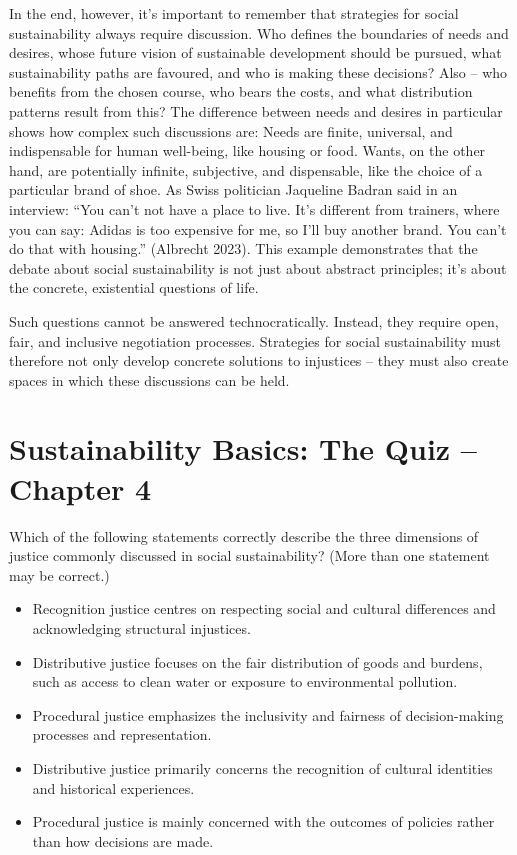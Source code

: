 \documentclass[
  a4paper,
  DIV=11,
  numbers=noendperiod,
  oneside,
  openany]{scrreprt}
\providecommand{\tightlist}{%
  \setlength{\itemsep}{0pt}\setlength{\parskip}{0pt}}
\begin{document}
In the end, however, it's important to remember that strategies for
social sustainability always require discussion. Who defines the
boundaries of needs and desires, whose future vision of sustainable
development should be pursued, what sustainability paths are favoured,
and who is making these decisions? Also -- who benefits from the chosen
course, who bears the costs, and what distribution patterns result from
this? The difference between needs and desires in particular shows how
complex such discussions are: Needs are finite, universal, and
indispensable for human well-being, like housing or food. Wants, on the
other hand, are potentially infinite, subjective, and dispensable, like
the choice of a particular brand of shoe. As Swiss politician Jaqueline
Badran said in an interview: ``You can't not have a place to live. It's
different from trainers, where you can say: Adidas is too expensive for
me, so I'll buy another brand. You can't do that with housing.''
(Albrecht 2023). This example demonstrates that the debate about social
sustainability is not just about abstract principles; it's about the
concrete, existential questions of life.

Such questions cannot be answered technocratically. Instead, they
require open, fair, and inclusive negotiation processes. Strategies for
social sustainability must therefore not only develop concrete solutions
to injustices -- they must also create spaces in which these discussions
can be held.

\section{Sustainability Basics: The Quiz -- Chapter
4}\label{sustainability-basics-the-quiz-chapter-4}

Which of the following statements correctly describe the three
dimensions of justice commonly discussed in social sustainability? (More
than one statement may be correct.)

\begin{itemize}
\tightlist
\item[$\square$]
  Recognition justice centres on respecting social and cultural
  differences and acknowledging structural injustices.
\item[$\square$]
  Distributive justice focuses on the fair distribution of goods and
  burdens, such as access to clean water or exposure to environmental
  pollution.
\item[$\square$]
  Procedural justice emphasizes the inclusivity and fairness of
  decision-making processes and representation.
\item[$\square$]
  Distributive justice primarily concerns the recognition of cultural
  identities and historical experiences.
\item[$\square$]
  Procedural justice is mainly concerned with the outcomes of policies
  rather than how decisions are made.
\end{itemize}
\end{document}
